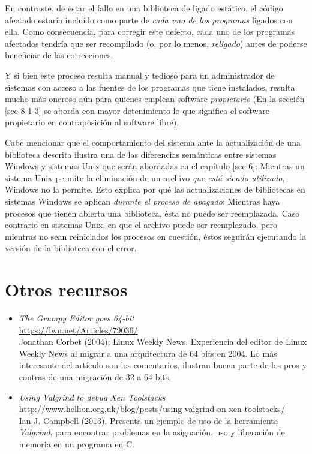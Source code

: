 \documentclass[11pt,fleqn]{book} %
\newcommand{\otrorec}[1]{ \\ {\small \url{#1}} \\ }
\begin{document}
En contraste, de estar el fallo en una biblioteca de ligado estático,
el código afectado estaría incluído como parte de \emph{cada uno de los programas} ligados con ella. Como consecuencia, para corregir este
defecto, cada uno de los programas afectados tendría que ser
recompilado (o, por lo menos, \emph{religado}) antes de poderse beneficiar
de las correcciones.

Y si bien este proceso resulta manual y tedioso para un administrador
de sistemas con acceso a las fuentes de los programas que tiene
instalados, resulta mucho más oneroso aún para quienes emplean
software \emph{propietario} (En la sección \ref{sec-8-1-3} se aborda
con mayor detenimiento lo que significa el software propietario en
contraposición al software libre).

Cabe mencionar que el comportamiento del sistema ante la actualización
de una biblioteca descrita ilustra una de las diferencias semánticas
entre sistemas Windows y sistemas Unix que serán abordadas en el
capítulo \ref{sec-6}: Mientras un sistema Unix permite la eliminación de
un archivo \emph{que está siendo utilizado}, Windows no la permite. Esto
explica por qué las actualizaciones de bibliotecas en sistemas Windows
se aplican \emph{durante el proceso de apagado}: Mientras haya procesos que
tienen abierta una biblioteca, ésta no puede ser reemplazada. Caso
contrario en sistemas Unix, en que el archivo puede ser reemplazado,
pero mientras no sean reiniciados los procesos en cuestión, éstos
seguirán ejecutando la versión de la biblioteca con el error.
\section{Otros recursos}
\label{sec-5-7}


\begin{itemize}
\item \emph{The Grumpy Editor goes 64-bit}
  \otrorec{https://lwn.net/Articles/79036/}
  Jonathan Corbet (2004); Linux Weekly News.  Experiencia del editor
  de Linux Weekly News al migrar a una arquitectura de 64 bits
  en 2004. Lo más interesante del artículo son los comentarios,
  ilustran buena parte de los pros y contras de una migración de 32 a
  64 bits.
\item \emph{Using Valgrind to debug Xen Toolstacks}
  \otrorec{http://www.hellion.org.uk/blog/posts/using-valgrind-on-xen-toolstacks/}
  Ian J. Campbell (2013). Presenta un ejemplo de uso de la herramienta
  \emph{Valgrind}, para encontrar problemas en la asignación, uso y
  liberación de memoria en un programa en C.
\end{itemize}
\end{document}
